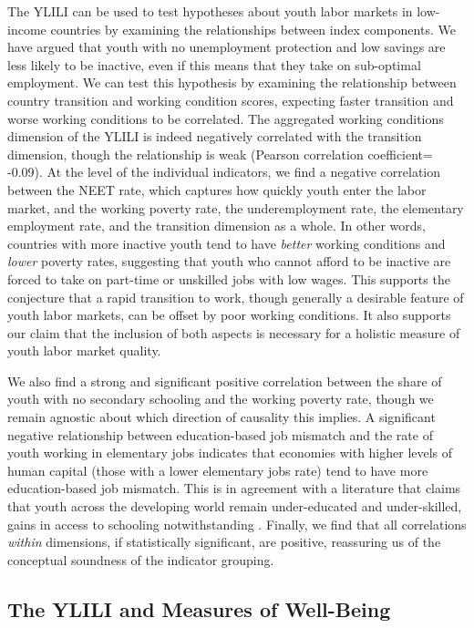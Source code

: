 \documentclass[
  a4paper, twoside, 12pt]{book}
\begin{document}
The YLILI can be used to test hypotheses about youth labor markets in low-income countries by examining the relationships between index components. We have argued that youth with no unemployment protection and low savings are less likely to be inactive, even if this means that they take on sub-optimal employment. We can test this hypothesis by examining the relationship between country transition and working condition scores, expecting faster transition and worse working conditions to be correlated. The aggregated working conditions dimension of the YLILI is indeed negatively correlated with the transition dimension, though the relationship is weak (Pearson correlation coefficient= -0.09). At the level of the individual indicators, we find a negative correlation between the NEET rate, which captures how quickly youth enter the labor market, and the working poverty rate, the underemployment rate, the elementary employment rate, and the transition dimension as a whole. In other words, countries with more inactive youth tend to have \emph{better} working conditions and \emph{lower} poverty rates, suggesting that youth who cannot afford to be inactive are forced to take on part-time or unskilled jobs with low wages. This supports the conjecture that a rapid transition to work, though generally a desirable feature of youth labor markets, can be offset by poor working conditions. It also supports our claim that the inclusion of both aspects is necessary for a holistic measure of youth labor market quality.

We also find a strong and significant positive correlation between the share of youth with no secondary schooling and the working poverty rate, though we remain agnostic about which direction of causality this implies. A significant negative relationship between education-based job mismatch and the rate of youth working in elementary jobs indicates that economies with higher levels of human capital (those with a lower elementary jobs rate) tend to have more education-based job mismatch. This is in agreement with a literature that claims that youth across the developing world remain under-educated and under-skilled, gains in access to schooling notwithstanding \autocite{morsy2020}. Finally, we find that all correlations \emph{within} dimensions, if statistically significant, are positive, reassuring us of the conceptual soundness of the indicator grouping.

\hypertarget{the-ylili-and-measures-of-well-being}{%
\subsection{The YLILI and Measures of Well-Being}\label{the-ylili-and-measures-of-well-being}}
\end{document}
